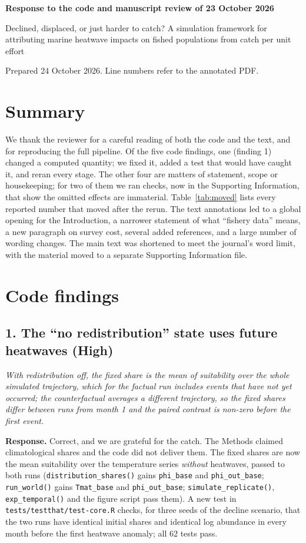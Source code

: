 \documentclass[11pt,a4paper]{article}
\newcommand{\rev}[1]{\par\medskip\noindent\textit{\color{black!60}#1}\par\smallskip}
\newcommand{\resp}{\noindent\textbf{Response.} }
\begin{document}
{\Large\bfseries Response to the code and manuscript review of 23 October 2026\par}
\smallskip
{\large Declined, displaced, or just harder to catch? A simulation framework for attributing marine heatwave impacts on fished populations from catch per unit effort\par}
\smallskip
{\small Prepared 24 October 2026. Line numbers refer to the annotated PDF.\par}

\section*{Summary}

We thank the reviewer for a careful reading of both the code and the text, and for reproducing the full pipeline. Of the five code findings, one (finding 1) changed a computed quantity; we fixed it, added a test that would have caught it, and reran every stage. The other four are matters of statement, scope or housekeeping; for two of them we ran checks, now in the Supporting Information, that show the omitted effects are immaterial. Table~\ref{tab:moved} lists every reported number that moved after the rerun. The text annotations led to a global opening for the Introduction, a narrower statement of what ``fishery data'' means, a new paragraph on survey cost, several added references, and a large number of wording changes. The main text was shortened to meet the journal's word limit, with the material moved to a separate Supporting Information file.

\section*{Code findings}

\subsection*{1. The ``no redistribution'' state uses future heatwaves (High)}

\rev{With redistribution off, the fixed share is the mean of suitability over the whole simulated trajectory, which for the factual run includes events that have not yet occurred; the counterfactual averages a different trajectory, so the fixed shares differ between runs from month 1 and the paired contrast is non-zero before the first event.}

\resp Correct, and we are grateful for the catch. The Methods claimed climatological shares and the code did not deliver them. The fixed shares are now the mean suitability over the temperature series \emph{without} heatwaves, passed to both runs (\texttt{distribution\_shares()} gains \texttt{phi\_base} and \texttt{phi\_out\_base}; \texttt{run\_world()} gains \texttt{Tmat\_base} and \texttt{phi\_out\_base}; \texttt{simulate\_replicate()}, \texttt{exp\_temporal()} and the figure script pass them). A new test in \texttt{tests/testthat/test-core.R} checks, for three seeds of the decline scenario, that the two runs have identical initial shares and identical log abundance in every month before the first heatwave anomaly; all 62 tests pass.
\end{document}
